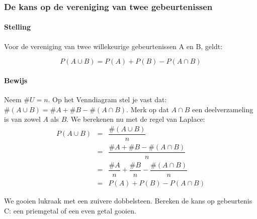 \documentclass[12pt,a4paper,twoside]{article}
\begin{document}
\begin{samepage}
\subsubsection{De kans op de vereniging van twee gebeurtenissen}

\paragraph*{Stelling }Voor de vereniging van twee willekeurige gebeurtenissen A en B, geldt:\\
\begin{mdframed}
$$P(A \cup B) = P(A) + P(B) - P(A \cap B)$$
\end{mdframed}

\paragraph*{Bewijs}
\begin{center}
\end{center}
Neem $\#U = n$. Op het Venndiagram stel je vast dat: $\#(A\cup B)=\#A + \#B - \#(A\cap B)$. Merk op dat $A \cap B$ een deelverzameling is van zowel $A$ als $B$. We berekenen nu met de regel van Laplace:
\begin{eqnarray*}
  P(A \cup B) &=& \dfrac{\#(A \cup B)}{n}\\
              &=& \dfrac{\#A + \#B - \#(A\cap B)}{n}\\
              &=& \dfrac{\#A}{n} + \dfrac{\#B}{n} - \dfrac{\#(A\cap B)}{n}\\
              &=& P(A) + P(B) - P(A\cap B)
\end{eqnarray*}
\end{samepage}

\begin{oefening}
We gooien lukraak met een zuivere dobbelsteen. Bereken de kans op gebeurtenis C:
een priemgetal of een even getal gooien.
\end{oefening}
\end{document}
